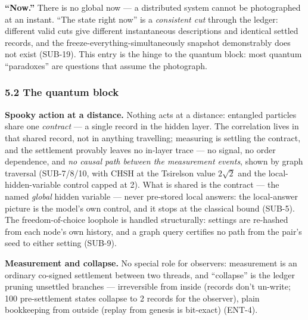 \documentclass[
  11pt,
]{article}
\begin{document}
\textbf{``Now.''} There is no global now --- a distributed system cannot
be photographed at an instant. ``The state right now'' is a
\emph{consistent cut} through the ledger: different valid cuts give
different instantaneous descriptions and identical settled records, and
the freeze-everything-simultaneously snapshot demonstrably does not
exist (SUB-19). This entry is the hinge to the quantum block: most
quantum ``paradoxes'' are questions that assume the photograph.

\subsubsection{5.2 The quantum block}\label{the-quantum-block}

\textbf{Spooky action at a distance.} Nothing acts at a distance:
entangled particles share one \emph{contract} --- a single record in the
hidden layer. The correlation lives in that shared record, not in
anything travelling; measuring is settling the contract, and the
settlement provably leaves no in-layer trace --- no signal, no order
dependence, and \emph{no causal path between the measurement events},
shown by graph traversal (SUB-7/8/10, with CHSH at the Tsirelson value
$2\sqrt{2}$ and the local-hidden-variable control capped at 2). What is shared
is the contract --- the named \emph{global} hidden variable --- never
pre-stored local answers: the local-answer picture is the model's own
control, and it stops at the classical bound (SUB-5). The
freedom-of-choice loophole is handled structurally: settings are
re-hashed from each node's own history, and a graph query certifies no
path from the pair's seed to either setting (SUB-9).

\textbf{Measurement and collapse.} No special role for observers:
measurement is an ordinary co-signed settlement between two threads, and
``collapse'' is the ledger pruning unsettled branches --- irreversible
from inside (records don't un-write; 100 pre-settlement states collapse
to 2 records for the observer), plain bookkeeping from outside (replay
from genesis is bit-exact) (ENT-4).
\end{document}

